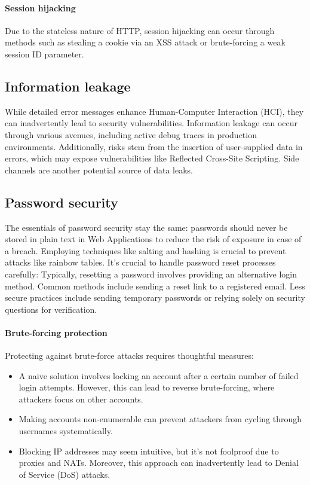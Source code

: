 \paragraph*{Session hijacking}
Due to the stateless nature of HTTP, session hijacking can occur through methods such as stealing a cookie via an XSS attack or brute-forcing a weak session ID parameter.



\subsection{Information leakage}
While detailed error messages enhance Human-Computer Interaction (HCI), they can inadvertently lead to security vulnerabilities. 
Information leakage can occur through various avenues, including active debug traces in production environments. 
Additionally, risks stem from the insertion of user-supplied data in errors, which may expose vulnerabilities like Reflected Cross-Site Scripting. 
Side channels are another potential source of data leaks.

\subsection{Password security}
The essentials of password security stay the same: passwords should never be stored in plain text in Web Applications to reduce the risk of exposure in case of a breach. 
Employing techniques like salting and hashing is crucial to prevent attacks like rainbow tables. 
It's crucial to handle password reset processes carefully: Typically, resetting a password involves providing an alternative login method. 
Common methods include sending a reset link to a registered email. 
Less secure practices include sending temporary passwords or relying solely on security questions for verification.

\paragraph*{Brute-forcing protection}
Protecting against brute-force attacks requires thoughtful measures:
\begin{itemize}
    \item A naive solution involves locking an account after a certain number of failed login attempts. 
        However, this can lead to reverse brute-forcing, where attackers focus on other accounts.
    \item Making accounts non-enumerable can prevent attackers from cycling through usernames systematically.
    \item  Blocking IP addresses may seem intuitive, but it's not foolproof due to proxies and NATs. 
        Moreover, this approach can inadvertently lead to Denial of Service (DoS) attacks.
\end{itemize}
